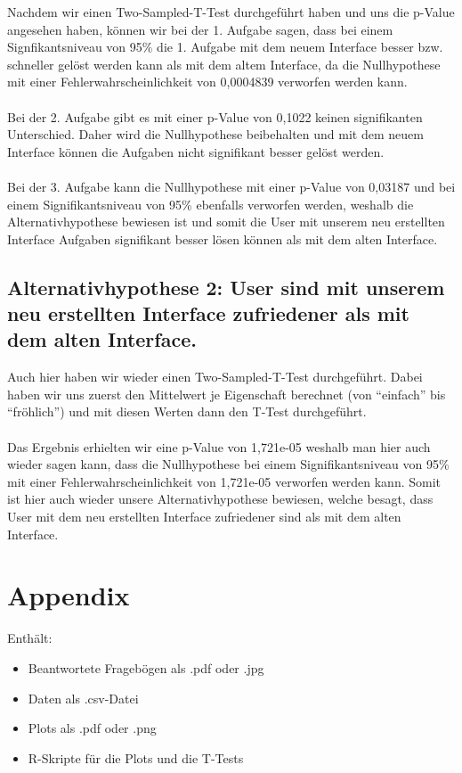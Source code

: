 \documentclass[a4paper,10pt]{scrartcl}
\begin{document}
Nachdem wir einen Two-Sampled-T-Test durchgeführt haben und uns die p-Value angesehen haben, können wir bei
der 1. Aufgabe sagen, dass bei einem Signfikantsniveau von 95\% die 1. Aufgabe mit dem neuem Interface besser bzw. schneller gelöst werden
kann als mit dem altem Interface, da die Nullhypothese mit einer Fehlerwahrscheinlichkeit von 0,0004839 verworfen werden kann.
\\ \\
Bei der 2. Aufgabe gibt es mit einer p-Value von 0,1022 keinen signifikanten Unterschied. Daher wird die Nullhypothese beibehalten und
mit dem neuem Interface können die Aufgaben nicht signifikant besser gelöst werden.
\\ \\
Bei der 3. Aufgabe kann die Nullhypothese mit einer p-Value von 0,03187 und bei einem Signifikantsniveau von 95\% ebenfalls verworfen werden,
weshalb die Alternativhypothese bewiesen ist und somit die User mit unserem neu erstellten Interface Aufgaben signifikant besser lösen können
als mit dem alten Interface.

\subsection{Alternativhypothese 2: User sind mit unserem neu erstellten Interface zufriedener als mit dem alten Interface. }

Auch hier haben wir wieder einen Two-Sampled-T-Test durchgeführt. Dabei haben wir uns zuerst den Mittelwert je Eigenschaft
berechnet (von ``einfach'' bis ``fröhlich'') und mit diesen Werten dann den T-Test durchgeführt.
\\ \\
Das Ergebnis erhielten wir eine p-Value von 1,721e-05 weshalb man hier auch wieder sagen kann, dass die Nullhypothese bei
einem Signifikantsniveau von 95\% mit einer Fehlerwahrscheinlichkeit von 1,721e-05 verworfen werden kann. Somit ist hier auch wieder unsere
Alternativhypothese bewiesen, welche besagt, dass User mit dem neu erstellten Interface zufriedener sind als mit dem alten Interface.


\section{Appendix}

Enthält:

\begin{itemize}
 \item Beantwortete Fragebögen als .pdf oder .jpg
 \item Daten als .csv-Datei
 \item Plots als .pdf oder .png
 \item R-Skripte für die Plots und die T-Tests
\end{itemize}
\end{document}
